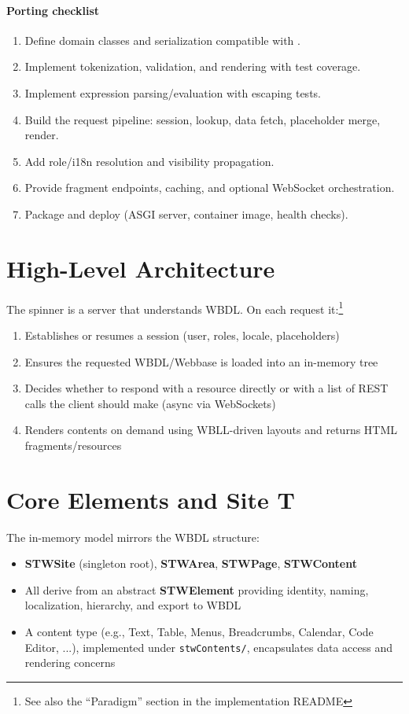 \paragraph{Porting checklist}
\begin{enumerate}
	\item Define domain classes and serialization compatible with \wbdl.
	\item Implement \wbll tokenization, validation, and rendering with test coverage.
	\item Implement \wbpl expression parsing/evaluation with escaping tests.
	\item Build the request pipeline: session, lookup, data fetch, placeholder merge, render.
	\item Add role/i18n resolution and visibility propagation.
	\item Provide fragment endpoints, caching, and optional WebSocket orchestration.
	\item Package and deploy (ASGI server, container image, health checks).
\end{enumerate}

\section{High-Level Architecture}
The spinner is a server that understands WBDL. On each request it:\footnote{See also the ``Paradigm'' section in the implementation README}
\begin{enumerate}
	\item Establishes or resumes a session (user, roles, locale, placeholders)
	\item Ensures the requested WBDL/Webbase is loaded into an in-memory tree
	\item Decides whether to respond with a resource directly or with a list of REST calls the client should make (async via WebSockets)
	\item Renders contents on demand using WBLL-driven layouts and returns HTML fragments/resources
\end{enumerate}

\section{Core Elements and Site T\ree}
The in-memory model mirrors the WBDL structure:
\begin{itemize}
	\item \textbf{STWSite} (singleton root), \textbf{STWArea}, \textbf{STWPage}, \textbf{STWContent}
	\item All derive from an abstract \textbf{STWElement} providing identity, naming, localization, hierarchy, and export to WBDL
	\item A content type (e.g., Text, Table, Menus, Breadcrumbs, Calendar, Code Editor, ...), implemented under \texttt{stwContents/}, encapsulates data access and rendering concerns
\end{itemize}

